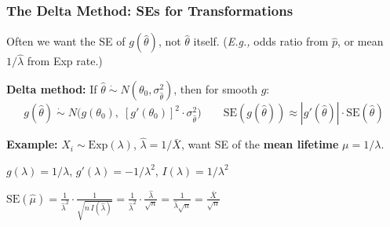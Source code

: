 \documentclass[aspectratio=169]{beamer}
\begin{document}
\begin{frame}
\frametitle{The Delta Method: SEs for Transformations}

\small
Often we want the SE of $g(\hat\theta)$, not $\hat\theta$ itself. \;(\textit{E.g.,} odds ratio from $\hat{p}$, or mean $1/\hat\lambda$ from Exp rate.)

\vspace{0.15cm}
\textbf{Delta method:} If $\hat\theta \;\dot\sim\; N(\theta_0, \sigma^2_{\hat\theta})$, then for smooth $g$:
\vspace{-0.1cm}
$$\boxed{g(\hat\theta) \;\dot\sim\; N\!\bigl(g(\theta_0),\; [g'(\theta_0)]^2 \cdot \sigma^2_{\hat\theta}\bigr)} \qquad \text{SE}(g(\hat\theta)) \approx |g'(\hat\theta)| \cdot \text{SE}(\hat\theta)$$

\vspace{-0.15cm}\pause
\textbf{Example:} $X_i \sim \text{Exp}(\lambda)$, $\hat\lambda = 1/\bar{X}$, want SE of the \textbf{mean lifetime} $\mu = 1/\lambda$.

\vspace{0.05cm}
\quad $g(\lambda) = 1/\lambda$, \;\;$g'(\lambda) = -1/\lambda^2$, \;\;$I(\lambda) = 1/\lambda^2$

\vspace{0.05cm}
\quad $\text{SE}(\hat\mu) = \frac{1}{\hat\lambda^2}\cdot\frac{1}{\sqrt{n\,I(\hat\lambda)}} = \frac{1}{\hat\lambda^2}\cdot\frac{\hat\lambda}{\sqrt{n}} = \frac{1}{\hat\lambda\sqrt{n}} = \frac{\bar{X}}{\sqrt{n}}$

\vspace{0.15cm}
\begin{center}
\end{center}
\end{frame}
\end{document}
